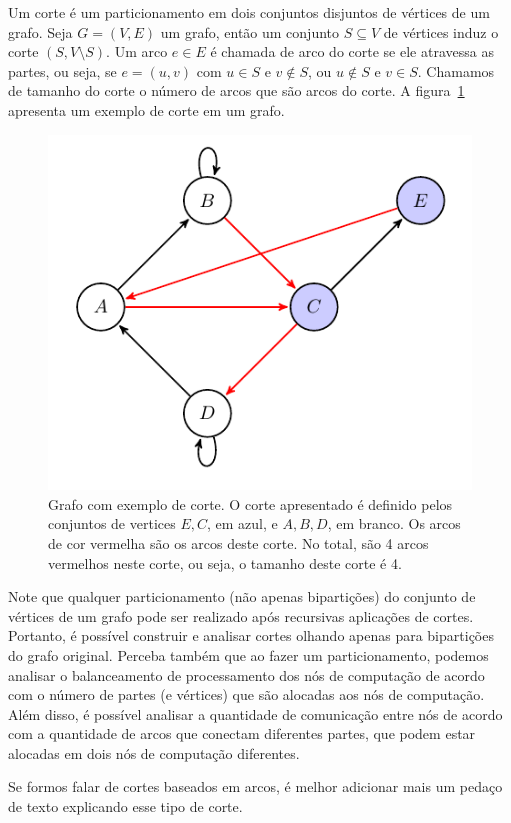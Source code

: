 \documentclass[conference]{IEEEtran}
\begin{document}
Um corte é um particionamento em dois conjuntos disjuntos de vértices de
um grafo. Seja $G = (V, E)$ um grafo, então um conjunto $S \subseteq V$
de vértices induz o corte $(S, V \setminus S)$. Um arco $e \in E$ é
chamada de arco do corte se ele atravessa as partes, ou seja, se
$e = (u, v)$ com $u \in S$ e $v \notin S$, ou $u \notin S$ e $v \in S$.
Chamamos de tamanho do corte o número de arcos que são arcos do corte. A
figura~\ref{fig:example_cut} apresenta um exemplo de corte em um grafo.

\begin{figure}
    \begin{center}
        \includegraphics[width=.5\textwidth]{fund_conc/cut_example.pdf}
    \end{center}
    \caption{Grafo com exemplo de corte. O corte apresentado é definido
    pelos conjuntos de vertices ${E, C}$, em azul, e $A, B, D$, em
    branco. Os arcos de cor vermelha são os arcos deste corte. No total,
    são 4 arcos vermelhos neste corte, ou seja, o tamanho deste corte
    é 4.}
    \label{fig:example_cut}
\end{figure}

Note que qualquer particionamento (não apenas bipartições) do conjunto
de vértices de um grafo pode ser realizado após recursivas aplicações de
cortes. Portanto, é possível construir e analisar cortes olhando apenas
para bipartições do grafo original. Perceba também que ao fazer um
particionamento, podemos analisar o balanceamento de processamento
dos nós de computação de acordo com o número de partes (e vértices)
que são alocadas aos nós de computação. Além disso, é possível analisar
a quantidade de comunicação entre nós de acordo com a quantidade de
arcos que conectam diferentes partes, que podem estar alocadas em dois
nós de computação diferentes.

{\color{blue} Se formos falar de cortes baseados em arcos, é melhor
adicionar mais um pedaço de texto explicando esse tipo de corte.}
\end{document}
